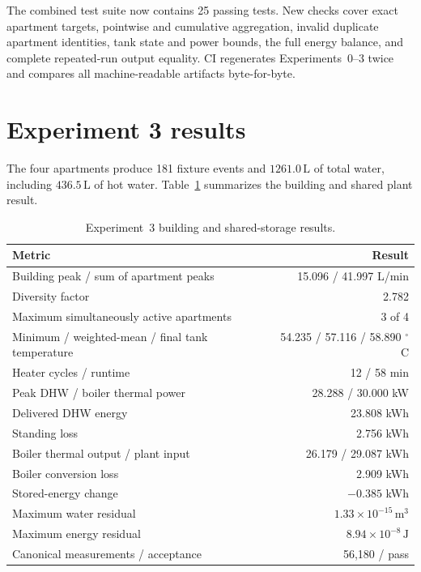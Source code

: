 \documentclass[11pt,a4paper]{article}
\begin{document}
The combined test suite now contains 25 passing tests. New checks cover exact
apartment targets, pointwise and cumulative aggregation, invalid duplicate
apartment identities, tank state and power bounds, the full energy balance, and
complete repeated-run output equality. CI regenerates Experiments~0--3 twice
and compares all machine-readable artifacts byte-for-byte.

\section{Experiment 3 results}
The four apartments produce 181 fixture events and
$1261.0\,\mathrm{L}$ of total water, including $436.5\,\mathrm{L}$ of hot
water. Table~\ref{tab:experiment3-results} summarizes the building and shared
plant result.

\begin{table}[htbp]
  \centering
  \caption{Experiment~3 building and shared-storage results.}
  \label{tab:experiment3-results}
  \begin{tabular}{lr}
    \toprule
    Metric & Result \\
    \midrule
    Building peak / sum of apartment peaks & 15.096 / 41.997 L/min \\
    Diversity factor & 2.782 \\
    Maximum simultaneously active apartments & 3 of 4 \\
    Minimum / weighted-mean / final tank temperature
      & 54.235 / 57.116 / 58.890 $^{\circ}$C \\
    Heater cycles / runtime & 12 / 58 min \\
    Peak DHW / boiler thermal power & 28.288 / 30.000 kW \\
    Delivered DHW energy & 23.808 kWh \\
    Standing loss & 2.756 kWh \\
    Boiler thermal output / plant input & 26.179 / 29.087 kWh \\
    Boiler conversion loss & 2.909 kWh \\
    Stored-energy change & $-0.385$ kWh \\
    Maximum water residual & $1.33\times10^{-15}\,\mathrm{m^3}$ \\
    Maximum energy residual & $8.94\times10^{-8}\,\mathrm{J}$ \\
    Canonical measurements / acceptance & 56,180 / pass \\
    \bottomrule
  \end{tabular}
\end{table}
\end{document}
